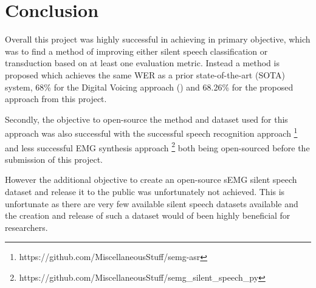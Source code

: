 \chapter{Conclusion} \label{chap:conclusion}

Overall this project was highly successful in achieving in primary objective,
which was to find a method of improving either silent speech classification
or transduction based on at least one evaluation metric. Instead a method is
proposed which achieves the same WER as a prior state-of-the-art (SOTA)
system, 68\% for the Digital Voicing approach (\cite{gaddy2020digital})
and 68.26\% for the proposed approach from this project.

Secondly, the objective to open-source the method and dataset used for
this approach was also successful with the successful
speech recognition approach
\footnote{https://github.com/MiscellaneousStuff/semg-asr}
and less successful EMG synthesis approach
\footnote{https://github.com/MiscellaneousStuff/semg\_silent\_speech\_py}
both being open-sourced before the submission of this project.

However the additional objective to create an open-source sEMG silent
speech dataset and release it to the public was unfortunately not achieved.
This is unfortunate as there are very few available silent speech datasets
available and the creation and release of such a dataset would of been
highly beneficial for researchers.